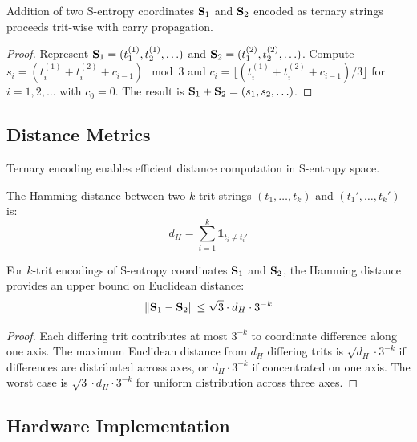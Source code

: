 \begin{proposition}
Addition of two S-entropy coordinates $\mathbf{S}_1$ and $\mathbf{S}_2$ encoded as ternary strings proceeds trit-wise with carry propagation.
\end{proposition}

\begin{proof}
Represent $\mathbf{S}_1 = (t_1^{(1)}, t_2^{(1)}, \ldots)$ and $\mathbf{S}_2 = (t_1^{(2)}, t_2^{(2)}, \ldots)$. Compute $s_i = (t_i^{(1)} + t_i^{(2)} + c_{i-1}) \mod 3$ and $c_i = \lfloor (t_i^{(1)} + t_i^{(2)} + c_{i-1}) / 3 \rfloor$ for $i = 1, 2, \ldots$ with $c_0 = 0$. The result is $\mathbf{S}_1 + \mathbf{S}_2 = (s_1, s_2, \ldots)$.
\end{proof}

\subsection{Distance Metrics}

Ternary encoding enables efficient distance computation in S-entropy space.

\begin{definition}
The Hamming distance between two $k$-trit strings $(t_1,\ldots,t_k)$ and $(t_1',\ldots,t_k')$ is:
\begin{equation}
d_H = \sum_{i=1}^{k} \mathbb{1}_{t_i \neq t_i'}
\end{equation}
\end{definition}

\begin{proposition}
For $k$-trit encodings of S-entropy coordinates $\mathbf{S}_1$ and $\mathbf{S}_2$, the Hamming distance provides an upper bound on Euclidean distance:
\begin{equation}
\|\mathbf{S}_1 - \mathbf{S}_2\| \leq \sqrt{3} \cdot d_H \cdot 3^{-k}
\end{equation}
\end{proposition}

\begin{proof}
Each differing trit contributes at most $3^{-k}$ to coordinate difference along one axis. The maximum Euclidean distance from $d_H$ differing trits is $\sqrt{d_H} \cdot 3^{-k}$ if differences are distributed across axes, or $d_H \cdot 3^{-k}$ if concentrated on one axis. The worst case is $\sqrt{3} \cdot d_H \cdot 3^{-k}$ for uniform distribution across three axes.
\end{proof}

\subsection{Hardware Implementation}

